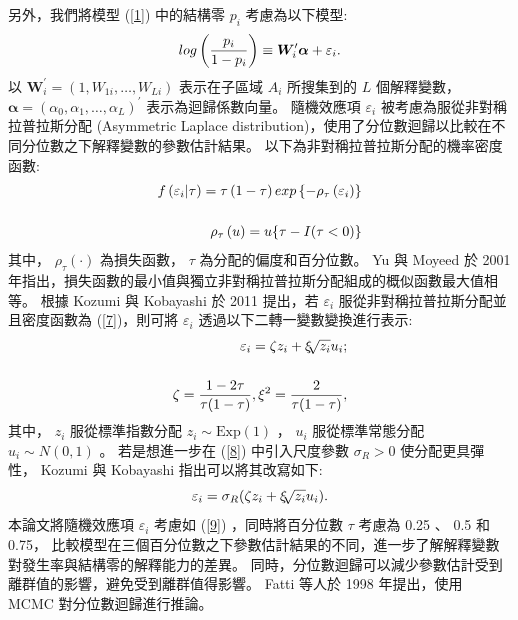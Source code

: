 \documentclass[12pt,a4paper]{article}
\begin{document}
\begin{CJK}{UTF8}{bkai}
另外，我們將模型 (\ref{1}) 中的結構零 $p_i$ 考慮為以下模型:
 \begin{equation}
 \setlength\abovedisplayskip{25pt}
 \setlength\belowdisplayskip{25pt}
 log\left(\frac{p_i}{1-p_i} \right) \equiv \bm{W}_{i}^\prime \bm{\alpha} + \varepsilon_{i} .
 \label{6}
 \end{equation}
\noindent
以 $\bm{W}_{i}^\prime = (1,W_{1i},\ldots,W_{Li})$ 表示在子區域 $A_i$ 所搜集到的 $L$ 個解釋變數， $\bm{\alpha} = \left(\alpha_{0},\alpha_{1},\dots,\alpha_{L} \right)^\prime$ 表示為迴歸係數向量。
隨機效應項 $\varepsilon_{i}$ 被考慮為服從非對稱拉普拉斯分配 (Asymmetric Laplace distribution)，使用了分位數迴歸以比較在不同分位數之下解釋變數的參數估計結果。
以下為非對稱拉普拉斯分配的機率密度函數:
 \begin{equation}
 \setlength\abovedisplayskip{25pt}
 \setlength\belowdisplayskip{25pt}
 \begin{split}
 f\left(\varepsilon_i|\tau\right) = \tau\left(1-\tau\right) exp\left\{-\rho_{\tau}\left(\varepsilon_i\right)\right\}\\[5mm]
 \rho_{\tau}\left(u\right) = u\{\tau-I(\tau<0)\}
 \end{split}
 \label{7}
 \end{equation}
\noindent
其中， $\rho_{\tau}\left(\cdot\right)$ 為損失函數， $\tau$ 為分配的偏度和百分位數。
Yu 與 Moyeed 於 2001 年指出，損失函數的最小值與獨立非對稱拉普拉斯分配組成的概似函數最大值相等。
根據 Kozumi 與 Kobayashi 於 2011 提出，若 $\varepsilon_i$ 服從非對稱拉普拉斯分配並且密度函數為 (\ref{7})，則可將 $\varepsilon_i$ 透過以下二轉一變數變換進行表示:
 \begin{equation}
 \setlength\abovedisplayskip{25pt}
 \setlength\belowdisplayskip{25pt}
 \begin{split}
 \varepsilon_i = \zeta z_i+\xi \sqrt[]{z_i} u_i;\\[5mm]
 \zeta = \frac{1-2\tau}{\tau(1-\tau)}, \xi^2 = \frac{2}{\tau(1-\tau)},
 \end{split}
 \label{8}
 \end{equation}
\noindent
其中， $z_i$ 服從標準指數分配 $z_i \sim \text{Exp}(1)$ ， $u_i$ 服從標準常態分配 $u_i\sim N(0,1)$ 。
若是想進一步在 (\ref{8}) 中引入尺度參數 $\sigma_R>0$ 使分配更具彈性， Kozumi 與 Kobayashi 指出可以將其改寫如下:
 \begin{equation}
 \setlength\abovedisplayskip{25pt}
 \setlength\belowdisplayskip{25pt}
 \varepsilon_i = \sigma_R(\zeta z_i+\xi \sqrt[]{z_i} u_i).
 \label{9}
 \end{equation}
\noindent
本論文將隨機效應項 $\varepsilon_i$ 考慮如 (\ref{9}) ，同時將百分位數 $\tau$ 考慮為 0.25 、 0.5 和 0.75，
比較模型在三個百分位數之下參數估計結果的不同，進一步了解解釋變數對發生率與結構零的解釋能力的差異。
同時，分位數迴歸可以減少參數估計受到離群值的影響，避免受到離群值得影響。
Fatti 等人於 1998 年提出，使用 MCMC 對分位數迴歸進行推論。




\end{CJK}
\end{document}
